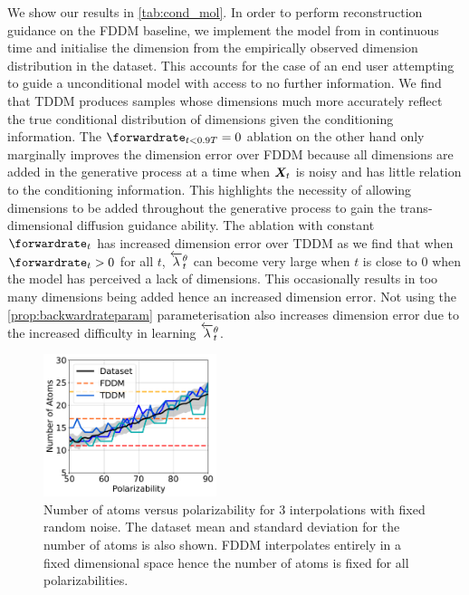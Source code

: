 We show our results in \cref{tab:cond_mol}. In order to perform reconstruction guidance on the FDDM baseline, we implement the model from \cite{hoogeboom2022equivariant} in continuous time and initialise the dimension from the empirically observed dimension distribution in the dataset.  This accounts for the case of an end user attempting to guide a unconditional model with access to no further information. We find that TDDM produces samples whose dimensions much more accurately reflect the true conditional distribution of dimensions given the conditioning information.
The $\forwardrate_{t<0.9T} = 0$ ablation on the other hand only marginally improves the dimension error over FDDM because all dimensions are added in the generative process at a time when ${\bm{X}}_t$ is noisy and has little relation to the conditioning information. This highlights the necessity of allowing dimensions to be added throughout the generative process to gain the trans-dimensional diffusion guidance ability. The ablation with constant $\forwardrate_t$ has increased dimension error over TDDM as we find that when $\forwardrate_t > 0$ for all $t$, $\overleftarrow{\lambda}_t^\theta$ can become very large when $t$ is close to 0 when the model has perceived a lack of dimensions. This occasionally results in too many dimensions being added hence an increased dimension error. Not using the \cref{prop:backwardrateparam} parameterisation also increases dimension error due to the increased difficulty in learning $\overleftarrow{\lambda}_t^\theta$.

\begin{figure}[t]
    \centering
    \includegraphics[width=0.45\textwidth]{figs/tddm/polarizability_vs_num_atoms.pdf}
    \caption{Number of atoms versus polarizability for $3$ interpolations with fixed random noise. The dataset mean and standard deviation for the number of atoms is also shown. FDDM interpolates entirely in a fixed dimensional space hence the number of atoms is fixed for all polarizabilities.}
    \label{fig:tddm-interp_plot}
\end{figure}

